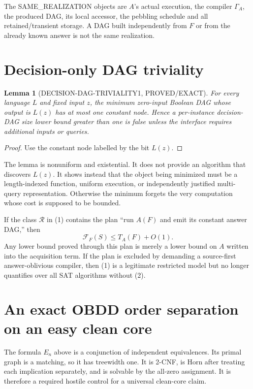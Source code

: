 \documentclass[11pt]{article}
\newtheorem{lemma}[theorem]{Lemma}
\begin{document}
The SAME\_REALIZATION objects are $A$'s actual execution, the compiler
$\Gamma_A$, the produced DAG, its local accessor, the pebbling schedule and
all retained/transient storage.  A DAG built independently from $F$ or from
the already known answer is not the same realization.

\section{Decision-only DAG triviality}
\begin{lemma}[DECISION-DAG-TRIVIALITY1, PROVED/EXACT]
For every language $L$ and fixed input $z$, the minimum zero-input Boolean
DAG whose output is $L(z)$ has at most one constant node.  Hence a per-instance
decision-DAG size lower bound greater than one is false unless the interface
requires additional inputs or queries.
\end{lemma}
\begin{proof}
Use the constant node labelled by the bit $L(z)$.
\end{proof}

The lemma is nonuniform and existential.  It does not provide an algorithm
that discovers $L(z)$.  It shows instead that the object being minimized must
be a length-indexed function, uniform execution, or independently justified
multi-query representation.  Otherwise the minimum forgets the very
computation whose cost is supposed to be bounded.

If the class $\mathcal R$ in (1) contains the plan ``run $A(F)$ and emit its
constant answer DAG,'' then
\[
 \mathcal F_F(S)\le T_A(F)+O(1).
\]
Any lower bound proved through this plan is merely a lower bound on $A$
written into the acquisition term.  If the plan is excluded by demanding a
source-first answer-oblivious compiler, then (1) is a legitimate restricted
model but no longer quantifies over all SAT algorithms without (2).

\section{An exact OBDD order separation on an easy clean core}
The formula $E_n$ above is a conjunction of independent equivalences.  Its
primal graph is a matching, so it has treewidth one.  It is 2-CNF, is Horn
after treating each implication separately, and is solvable by the all-zero
assignment.  It is therefore a required hostile control for a universal
clean-core claim.
\end{document}
